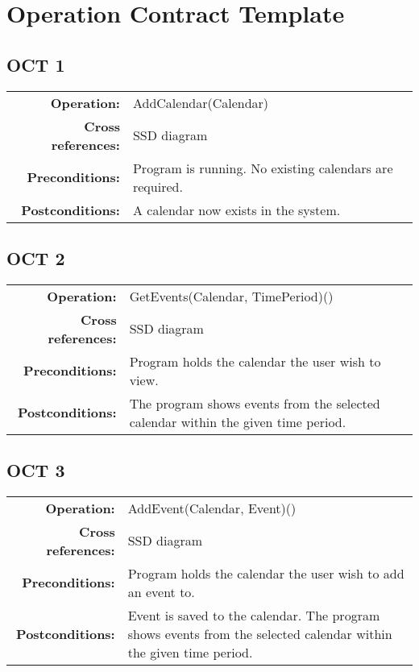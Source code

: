 \section{Operation Contract Template}
  \subsection{OCT 1}
    \begin{table*}[ht]\centering
      \begin{tabularx}{\textwidth}{@{}|rX|@{}}\hline
        \textbf{Operation:}        & AddCalendar(Calendar) \\
        \textbf{Cross references:} & SSD diagram\\
        \textbf{Preconditions:}    & Program is running. No existing calendars are required. \\
        \textbf{Postconditions:}   & A calendar now exists in the system. \\\hline
      \end{tabularx}
    \end{table*}
  \subsection{OCT 2}
    \begin{table*}[ht]\centering
      \begin{tabularx}{\textwidth}{@{}|rX|@{}}\hline
        \textbf{Operation:}        & GetEvents(Calendar, TimePeriod)()\\
        \textbf{Cross references:} & SSD diagram \\
        \textbf{Preconditions:}    & Program holds the calendar the user wish to view. \\
        \textbf{Postconditions:}   & The program shows events from the selected calendar within the given time period. \\\hline
      \end{tabularx}
    \end{table*}
  \subsection{OCT 3}
    \begin{table*}[ht]\centering
      \begin{tabularx}{\textwidth}{@{}|rX|@{}}\hline
        \textbf{Operation:}        & AddEvent(Calendar, Event)()\\
        \textbf{Cross references:} & SSD diagram \\
        \textbf{Preconditions:}    & Program holds the calendar the user wish to add an event to. \\
        \textbf{Postconditions:}   & Event is saved to the calendar. The program shows events from the selected calendar within the given time period. \\\hline
      \end{tabularx}
    \end{table*}
\newpage

